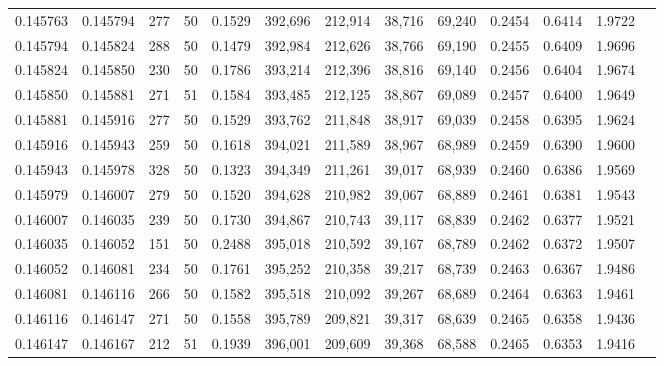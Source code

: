 \begin{tabular}{rrrrrrrrrrrrr}
0.145763 & 0.145794 &   277 &  50 &                                     0.1529 & 392,696 & 212,914 &  38,716 &  69,240 & 0.2454 & 0.6414 & 1.9722 \\
0.145794 & 0.145824 &   288 &  50 &                                     0.1479 & 392,984 & 212,626 &  38,766 &  69,190 & 0.2455 & 0.6409 & 1.9696 \\
0.145824 & 0.145850 &   230 &  50 &                                     0.1786 & 393,214 & 212,396 &  38,816 &  69,140 & 0.2456 & 0.6404 & 1.9674 \\
0.145850 & 0.145881 &   271 &  51 &                                     0.1584 & 393,485 & 212,125 &  38,867 &  69,089 & 0.2457 & 0.6400 & 1.9649 \\
0.145881 & 0.145916 &   277 &  50 &                                     0.1529 & 393,762 & 211,848 &  38,917 &  69,039 & 0.2458 & 0.6395 & 1.9624 \\
0.145916 & 0.145943 &   259 &  50 &                                     0.1618 & 394,021 & 211,589 &  38,967 &  68,989 & 0.2459 & 0.6390 & 1.9600 \\
0.145943 & 0.145978 &   328 &  50 &                                     0.1323 & 394,349 & 211,261 &  39,017 &  68,939 & 0.2460 & 0.6386 & 1.9569 \\
0.145979 & 0.146007 &   279 &  50 &                                     0.1520 & 394,628 & 210,982 &  39,067 &  68,889 & 0.2461 & 0.6381 & 1.9543 \\
0.146007 & 0.146035 &   239 &  50 &                                     0.1730 & 394,867 & 210,743 &  39,117 &  68,839 & 0.2462 & 0.6377 & 1.9521 \\
0.146035 & 0.146052 &   151 &  50 &                                     0.2488 & 395,018 & 210,592 &  39,167 &  68,789 & 0.2462 & 0.6372 & 1.9507 \\
0.146052 & 0.146081 &   234 &  50 &                                     0.1761 & 395,252 & 210,358 &  39,217 &  68,739 & 0.2463 & 0.6367 & 1.9486 \\
0.146081 & 0.146116 &   266 &  50 &                                     0.1582 & 395,518 & 210,092 &  39,267 &  68,689 & 0.2464 & 0.6363 & 1.9461 \\
0.146116 & 0.146147 &   271 &  50 &                                     0.1558 & 395,789 & 209,821 &  39,317 &  68,639 & 0.2465 & 0.6358 & 1.9436 \\
0.146147 & 0.146167 &   212 &  51 &                                     0.1939 & 396,001 & 209,609 &  39,368 &  68,588 & 0.2465 & 0.6353 & 1.9416 \\

\end{tabular}
